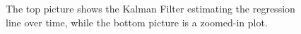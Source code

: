 \begin{figure}
    \centering
    \begin{subfigure}[b]{\textwidth}
    \end{subfigure}
    \hfill
    \begin{subfigure}[b]{\textwidth}
        \centering
    \end{subfigure}
    \vspace{-0.8cm}
    \caption{The top picture shows the Kalman Filter estimating the regression line over time, while the bottom picture is a zoomed-in plot.}
    \label{fig:ratios_kf}
\end{figure}

